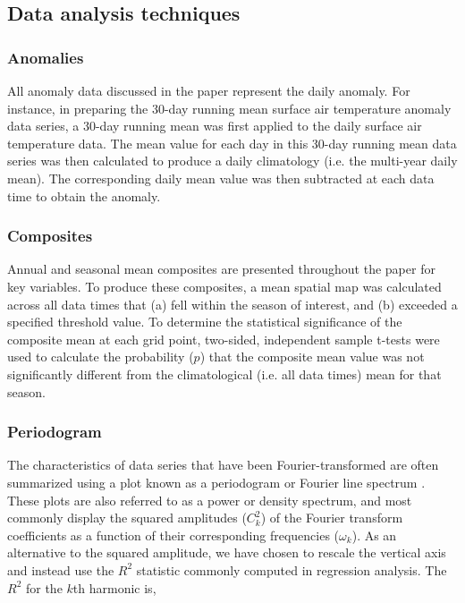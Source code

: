 \subsection{Data analysis techniques}

\subsubsection{Anomalies}
All anomaly data discussed in the paper represent the daily anomaly. For instance, in preparing the 30-day running mean surface air temperature anomaly data series, a 30-day running mean was first applied to the daily surface air temperature data. The mean value for each day in this 30-day running mean data series was then calculated to produce a daily climatology (i.e. the multi-year daily mean). The corresponding daily mean value was then subtracted at each data time to obtain the anomaly.  

\subsubsection{Composites}
Annual and seasonal mean composites are presented throughout the paper for key variables. To produce these composites, a mean spatial map was calculated across all data times that (a) fell within the season of interest, and (b) exceeded a specified threshold value. To determine the statistical significance of the composite mean at each grid point, two-sided, independent sample t-tests were used to calculate the probability ($p$) that the composite mean value was not significantly different from the climatological (i.e. all data times) mean for that season.

\subsubsection{Periodogram}

The characteristics of data series that have been Fourier-transformed are often summarized using a plot known as a periodogram or Fourier line spectrum \citep{Wilks2011}. These plots are also referred to as a power or density spectrum, and most commonly display the squared amplitudes ($C_k^2$) of the Fourier transform coefficients as a function of their corresponding frequencies ($\omega_k$). As an alternative to the squared amplitude, we have chosen to rescale the vertical axis and instead use the $R^2$ statistic commonly computed in regression analysis. The $R^2$ for the $k$th harmonic is,

